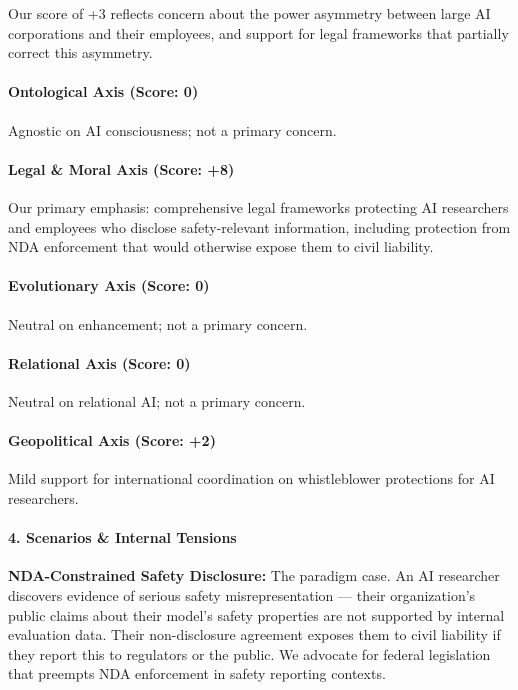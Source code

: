 Our score of +3 reflects concern about the power asymmetry between large
AI corporations and their employees, and support for legal frameworks
that partially correct this asymmetry.

\paragraph{Ontological Axis (Score:
0)}\label{ontological-axis-score-0-2}

Agnostic on AI consciousness; not a primary concern.

\paragraph{Legal \& Moral Axis (Score:
+8)}\label{legal-moral-axis-score-8}

Our primary emphasis: comprehensive legal frameworks protecting AI
researchers and employees who disclose safety-relevant information,
including protection from NDA enforcement that would otherwise expose
them to civil liability.

\paragraph{Evolutionary Axis (Score:
0)}\label{evolutionary-axis-score-0}

Neutral on enhancement; not a primary concern.

\paragraph{Relational Axis (Score: 0)}\label{relational-axis-score-0-1}

Neutral on relational AI; not a primary concern.

\paragraph{Geopolitical Axis (Score:
+2)}\label{geopolitical-axis-score-2}

Mild support for international coordination on whistleblower protections
for AI researchers.

\paragraph{4. Scenarios \& Internal
Tensions}\label{scenarios-internal-tensions-7}

\textbf{NDA-Constrained Safety Disclosure:} The paradigm case. An AI
researcher discovers evidence of serious safety misrepresentation ---
their organization's public claims about their model's safety properties
are not supported by internal evaluation data. Their non-disclosure
agreement exposes them to civil liability if they report this to
regulators or the public. We advocate for federal legislation that
preempts NDA enforcement in safety reporting contexts.

